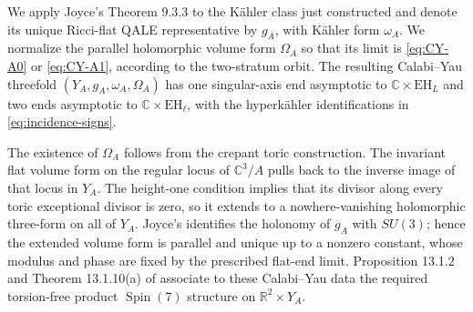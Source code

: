 \documentclass[11pt]{article}
\theoremstyle{remark}\newtheorem{remark}[theorem]{Remark}
\newcommand{\SpinSeven}{\operatorname{Spin}(7)}
\newcommand{\EH}{\mathrm{EH}}
\newcommand{\R}{\mathbb R}
\newcommand{\C}{\mathbb C}
\begin{document}
We apply Joyce's Theorem 9.3.3 to the K\"ahler class just constructed and
denote its unique Ricci-flat QALE representative by $g_A$, with K\"ahler
form $\omega_A$.  We normalize the parallel holomorphic volume form
$\Omega_A$ so that its limit is \eqref{eq:CY-A0} or \eqref{eq:CY-A1},
according to the two-stratum orbit.  The resulting Calabi--Yau threefold
$(Y_A,g_A,\omega_A,\Omega_A)$ has one singular-axis end asymptotic to
$\C\times\EH_L$ and two ends asymptotic to $\C\times\EH_\ell$, with the
hyperk\"ahler identifications in \eqref{eq:incidence-signs}.

The existence of $\Omega_A$ follows from the crepant toric construction.
The invariant flat volume form on the regular locus of $\C^3/A$ pulls back
to the inverse image of that locus in $Y_A$.  The height-one condition
implies that its divisor along every toric exceptional divisor is zero, so
it extends to a nowhere-vanishing holomorphic three-form on all of $Y_A$.
Joyce's \cite[Example 9.3.6 and Theorem 9.3.4]{JoyceBook} identifies the
holonomy of $g_A$ with $SU(3)$; hence the extended volume form is parallel
and unique up to a nonzero constant, whose modulus and phase are fixed by
the prescribed flat-end limit.  Proposition 13.1.2 and Theorem 13.1.10(a)
of \cite{JoyceBook} associate to these Calabi--Yau data the required
torsion-free product $\SpinSeven$ structure on $\R^2\times Y_A$.
\end{document}
